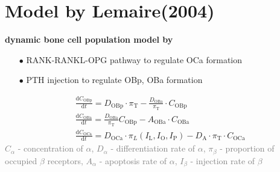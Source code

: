 \documentclass[%
aspectratio=169,  %
]{beamer}
\begin{document}
\section{Model by Lemaire(2004)}
\begin{frame}
\textbf{dynamic bone cell population model by \cite{Lemaire.2004}}
\begin{itemize}
	\item[$\bullet$] RANK-RANKL-OPG pathway to regulate OCa formation
	\item [$\bullet$]  PTH injection to regulate OBp, OBa formation
\end{itemize}
\begin{subequations}
	\begin{align}
		& \frac{\text{d} C_\text{OBp}}{\text{d} t} = D_\text{OBp} \cdot \pi_\text{T} - \frac{D_\text{OBa}}{\pi_\text{T}} \cdot C_\text{OBp}\\
		& \frac{\text{d} C_\text{OBa}}{\text{d} t} = \frac{D_\text{OBa}}{\pi_\text{T}} C_\text{OBp} - A_\text{OBa} \cdot C_\text{OBa} \\
		& \frac{\text{d} C_\text{OCa}}{\text{d} t} = D_\text{OCa} \cdot \pi_L(I_\text{L}, I_\text{O}, I_\text{P}) - D_\text{A} \cdot \pi_\text{T}\cdot C_\text{OCa}
	\end{align}
	\label{eq:mode1}
\end{subequations}
\textcolor{gray}{$C_\alpha$ - concentration of $\alpha$, $D_\alpha$ - differentiation rate of $\alpha$, $\pi_\beta$ - proportion of occupied $\beta$ receptors, $A_\alpha$ - apoptosis rate of $\alpha$, $I_\beta$ - injection rate of $\beta$}
\end{frame}
\end{document}

